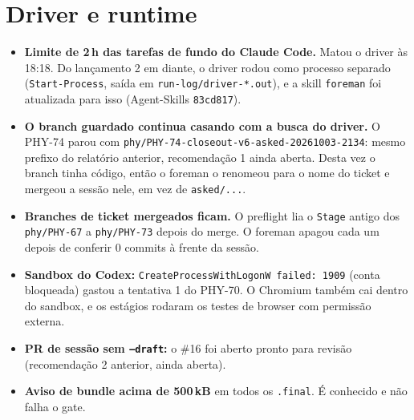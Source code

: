 \documentclass[11pt,a4paper]{article}
\begin{document}
\section{Driver e runtime}
\begin{itemize}
  \item \textbf{Limite de 2\,h das tarefas de fundo do Claude Code.} Matou o
        driver às 18:18. Do lançamento 2 em diante, o driver rodou como
        processo separado (\texttt{Start-Process}, saída em
        \texttt{run-log/driver-*.out}), e a skill \texttt{foreman} foi
        atualizada para isso (Agent-Skills \texttt{83cd817}).
  \item \textbf{O branch guardado continua casando com a busca do driver.} O
        PHY-74 parou com \texttt{phy/PHY-74-closeout-v6-asked-20261003-2134}:
        mesmo prefixo do relatório anterior, recomendação 1 ainda aberta. Desta
        vez o branch tinha código, então o foreman o renomeou para o nome do
        ticket e mergeou a sessão nele, em vez de \texttt{asked/...}.
  \item \textbf{Branches de ticket mergeados ficam.} O preflight lia o
        \texttt{Stage} antigo dos \texttt{phy/PHY-67} a \texttt{phy/PHY-73}
        depois do merge. O foreman apagou cada um depois de conferir 0 commits
        à frente da sessão.
  \item \textbf{Sandbox do Codex:} \texttt{CreateProcessWithLogonW failed: 1909}
        (conta bloqueada) gastou a tentativa 1 do PHY-70. O Chromium também cai
        dentro do sandbox, e os estágios rodaram os testes de browser com
        permissão externa.
  \item \textbf{PR de sessão sem \texttt{--draft}:} o \#16 foi aberto pronto
        para revisão (recomendação 2 anterior, ainda aberta).
  \item \textbf{Aviso de bundle acima de 500\,kB} em todos os \texttt{.final}.
        É conhecido e não falha o gate.
\end{itemize}
\end{document}
